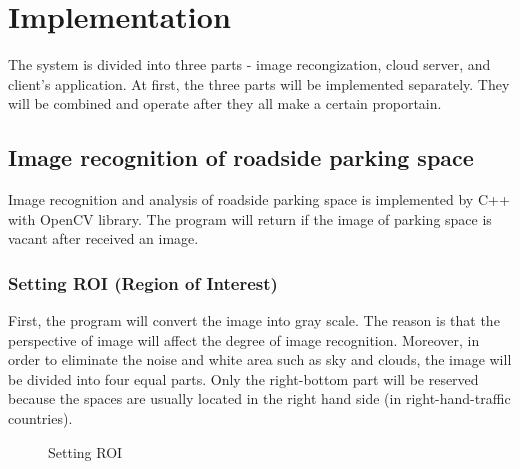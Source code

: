 \documentclass[runningheads,a4paper]{llncs}
\begin{document}
\section{Implementation}\label{sec:implementation}

The system is divided into three parts - image recongization, cloud
server, and client's application. At first, the three parts will be implemented
separately. They will be combined and operate after they all make a certain proportain.

\subsection{Image recognition of roadside parking space}

Image recognition and analysis of roadside parking space is implemented by C++ with
OpenCV library. The program will return if the image of parking space is
vacant after received an image.

\subsubsection{Setting ROI (Region of Interest)}

First, the program will convert the image into gray scale. The reason is
that the perspective of image will affect the degree of image
recognition. Moreover, in order to eliminate the noise and white area such
as sky and clouds, the image will be divided into four equal parts.
Only the right-bottom part will be reserved because the spaces are
usually located in the right hand side (in right-hand-traffic countries).

\begin{figure}[tbp]
	\hspace{0.2in}
	\caption{Setting ROI}
	\label{fig:ROI}
\end{figure}
\end{document}
